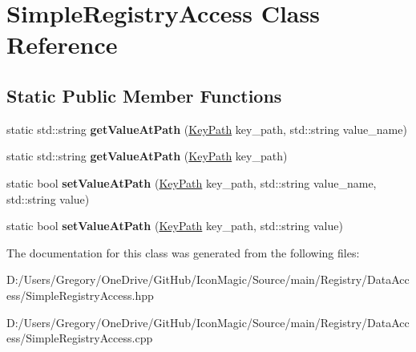 \hypertarget{class_simple_registry_access}{}\section{Simple\+Registry\+Access Class Reference}
\label{class_simple_registry_access}
\subsection*{Static Public Member Functions}
\begin{DoxyCompactItemize}
\item 
\hypertarget{class_simple_registry_access_accef2c679695c6e05a9e7c1c2a962481}{}static std\+::string {\bfseries get\+Value\+At\+Path} (\hyperlink{class_key_path}{Key\+Path} key\+\_\+path, std\+::string value\+\_\+name)\label{class_simple_registry_access_accef2c679695c6e05a9e7c1c2a962481}

\item 
\hypertarget{class_simple_registry_access_afb4986051b99ff89e156a2ab6b89aca3}{}static std\+::string {\bfseries get\+Value\+At\+Path} (\hyperlink{class_key_path}{Key\+Path} key\+\_\+path)\label{class_simple_registry_access_afb4986051b99ff89e156a2ab6b89aca3}

\item 
\hypertarget{class_simple_registry_access_a75e85e4de87a14c50a81b3cd080a2a97}{}static bool {\bfseries set\+Value\+At\+Path} (\hyperlink{class_key_path}{Key\+Path} key\+\_\+path, std\+::string value\+\_\+name, std\+::string value)\label{class_simple_registry_access_a75e85e4de87a14c50a81b3cd080a2a97}

\item 
\hypertarget{class_simple_registry_access_aea8420eb295c6c9e11093b1928a8591c}{}static bool {\bfseries set\+Value\+At\+Path} (\hyperlink{class_key_path}{Key\+Path} key\+\_\+path, std\+::string value)\label{class_simple_registry_access_aea8420eb295c6c9e11093b1928a8591c}

\end{DoxyCompactItemize}


The documentation for this class was generated from the following files\+:\begin{DoxyCompactItemize}
\item 
D\+:/\+Users/\+Gregory/\+One\+Drive/\+Git\+Hub/\+Icon\+Magic/\+Source/main/\+Registry/\+Data\+Access/Simple\+Registry\+Access.\+hpp\item 
D\+:/\+Users/\+Gregory/\+One\+Drive/\+Git\+Hub/\+Icon\+Magic/\+Source/main/\+Registry/\+Data\+Access/Simple\+Registry\+Access.\+cpp\end{DoxyCompactItemize}

